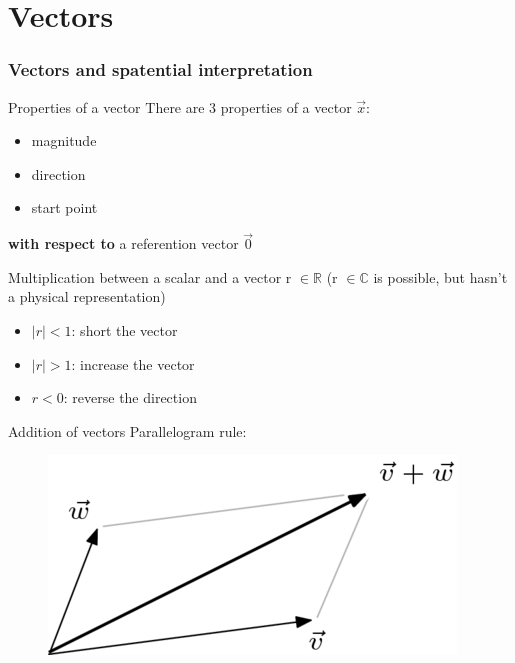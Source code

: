 \section{Vectors}

\begin{frame}
	\frametitle{Vectors and spatential interpretation}
	\begin{block}{Properties of a vector}
		There are 3 properties of a vector $\overrightarrow{x}$:
		\begin{itemize}
			\item magnitude
			\item direction
			\item start point
		\end{itemize}
		{\bf with respect to} a referention vector $\overrightarrow{0}$
	\end{block}
\end{frame}

\begin{frame}
	\begin{block}{Multiplication between a scalar and a vector}
		r $\in \mathbb{R}$ (r $\in \mathbb{C}$ is possible, but hasn't a physical representation)
		\begin{itemize}
			\item $|r|<1$: short the vector
			\item $|r|>1$: increase the vector
			\item $r<0$: reverse the direction
		\end{itemize}
	\end{block}
	\begin{block}{Addition of vectors}
		Parallelogram rule:

		\begin{figure}
			\centering
			\includegraphics[width=0.4\linewidth]{optelling}
		\end{figure}
	\end{block} 
\end{frame}

